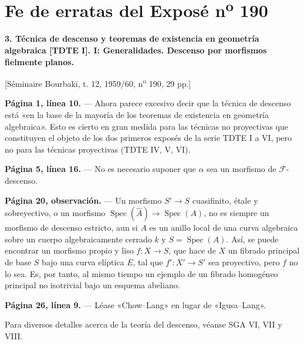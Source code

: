 \clearpage
\chapter*{Fe de erratas del Exposé n\textsuperscript{o} 190}
\setcounter{footnote}{0}

\noindent\textbf{3. Técnica de descenso y teoremas de existencia en geometría
algebraica [TDTE I]. I: Generalidades. Descenso por morfismos fielmente planos.}

\begin{center}
[Séminaire Bourbaki, t. 12, 1959/60, n\textsuperscript{o} 190, 29 pp.]
\end{center}

\noindent\textbf{Página 1, línea 10.} --- Ahora parece excesivo decir que la
técnica de descenso está «en la base de la mayoría de los teoremas de
existencia en geometría algebraica». Esto es cierto en gran medida para las
técnicas no proyectivas que constituyen el objeto de los dos primeros exposés
de la serie TDTE I a VI, pero no para las técnicas proyectivas (TDTE IV, V,
VI).

\noindent\textbf{Página 5, línea 16.} --- No es necesario suponer que $\alpha$
sea un morfismo de $\mathcal F$-descenso.

\noindent\textbf{Página 20, observación.} --- Un morfismo
$S'\longrightarrow S$ cuasifinito, étale y sobreyectivo, o un morfismo
$\operatorname{Spec}(\widehat A)\longrightarrow\operatorname{Spec}(A)$, no es
siempre un morfismo de descenso estricto, aun si $A$ es un anillo local de una
curva algebraica sobre un cuerpo algebraicamente cerrado $k$ y
$S=\operatorname{Spec}(A)$. Así, se puede encontrar un morfismo propio y liso
$f:X\longrightarrow S$, que hace de $X$ un fibrado principal de base $S$ bajo
una curva elíptica $E$, tal que $f':X'\longrightarrow S'$ sea proyectivo, pero
$f$ no lo sea. Es, por tanto, al mismo tiempo un ejemplo de un fibrado
homogéneo principal no isotrivial bajo un esquema abeliano.

\noindent\textbf{Página 26, línea 9.} --- Léase «Chow--Lang» en lugar de
«Igusa--Lang».

Para diversos detalles acerca de la teoría del descenso, véanse SGA VI, VII y
VIII.
